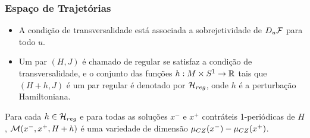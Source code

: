 \documentclass{beamer}
\begin{document}
\begin{footnotesize}

	
	\begin{frame}
		\frametitle{Espaço de Trajetórias }
		\begin{itemize}
			
			\item A condição de transversalidade está associada a sobrejetividade de $D_{u}\mathcal{F}$ para todo $u$.
			
			\item Um par $(H, J)$ é chamado de regular se satisfaz a condição de transversalidade, e o conjunto das funções $h:M\times S^{1} \to \mathbb{R}^{}$ tais que $(H+h,J)$ é um par regular é denotado por $\mathcal{H}_{reg}$, onde $h$ é a perturbação Hamiltoniana.
		\end{itemize}
		
		\begin{teorema}
			Para cada $h \in \mathcal{H}_{reg}$ e para todas as soluções $x^{-}$ e $x^{+}$ contráteis 1-periódicas de $H$, $\mathcal{M}(x^{-}, x^{+}, H+h)$ é uma variedade de dimensão $\mu_{CZ}(x^{-})-\mu_{CZ}(x^{+})$.
		\end{teorema}
	\end{frame}
	

\end{footnotesize}
\end{document}
